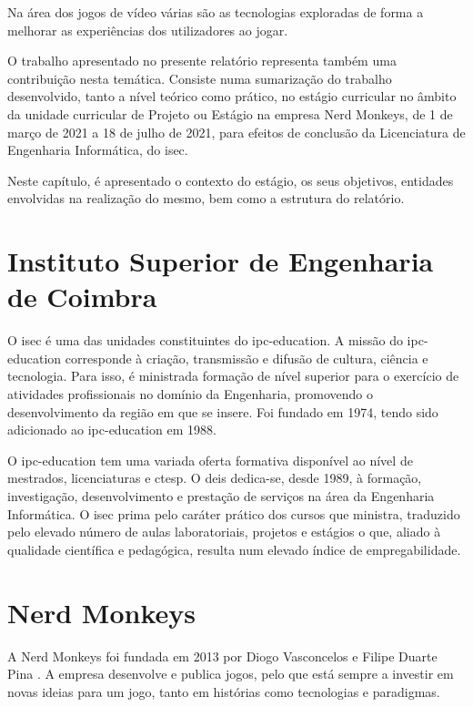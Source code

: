 

\label{chap:introducao}

Na área dos jogos de vídeo várias são as tecnologias exploradas de forma a melhorar as experiências dos utilizadores ao jogar.

O trabalho apresentado no presente relatório representa também uma contribuição nesta temática. Consiste numa sumarização do
trabalho desenvolvido, tanto a nível teórico como prático, no estágio curricular no âmbito da unidade curricular de Projeto ou Estágio na empresa
Nerd Monkeys, de 1 de março de 2021 a 18 de julho de 2021, para efeitos de conclusão da
Licenciatura de Engenharia Informática, do \acrfull{isec}.

Neste capítulo, é apresentado o contexto do estágio, os seus objetivos,
entidades envolvidas na realização do mesmo, bem como a estrutura do relatório.

\section{Instituto Superior de Engenharia de Coimbra}

O \acrshort{isec} é uma das
unidades constituintes do \gls{ipc-education}. A
missão do \gls{ipc-education} corresponde à criação, transmissão e difusão de cultura, ciência e tecnologia. Para isso, é ministrada formação de nível superior para o exercício de atividades profissionais no domínio da Engenharia,
promovendo o desenvolvimento da região em que se insere. Foi fundado em
1974, tendo sido adicionado ao \acrshort{ipc-education} em 1988.

O \acrshort{ipc-education} tem uma variada oferta formativa disponível ao nível de mestrados, licenciaturas e \acrfull{ctesp}. O \acrfull{deis} dedica-se, desde 1989, à formação, investigação, desenvolvimento e prestação de serviços na área da Engenharia Informática. O \acrshort{isec} prima pelo caráter prático dos cursos que ministra, traduzido pelo elevado número de aulas laboratoriais, projetos e estágios o que, aliado à qualidade científica e pedagógica, resulta num elevado índice de empregabilidade.
\cite{isec_wiki}

\section{Nerd Monkeys}

A Nerd Monkeys foi fundada em 2013 por Diogo Vasconcelos e Filipe Duarte Pina \cite{nerdmonkeys_interview_eurogamerpt}. A empresa desenvolve e publica jogos, pelo que está sempre a investir em novas ideias para um jogo, tanto em histórias como tecnologias e paradigmas.

